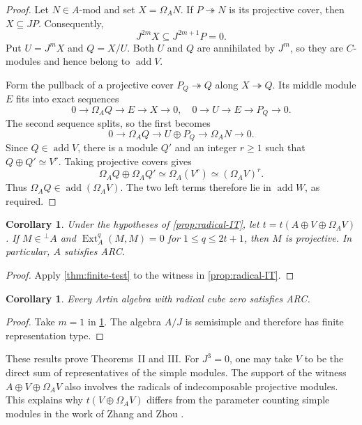 \documentclass[a4paper,reqno]{amsart}
\numberwithin{equation}{section}
\newtheorem{cor}[thm]{Corollary}
\theoremstyle{definition}
\DeclareMathOperator{\Ext}{Ext}
\DeclareMathOperator{\add}{add}
\newcommand{\modA}{A\text{-}\mathrm{mod}}
\newcommand{\perpA}{{}^{\perp}A}
\begin{document}
\begin{proof}
Let $N\in\modA$ and set $X=\Omega_A N$. If $P\twoheadrightarrow N$ is its projective cover, then $X\subseteq JP$. Consequently,
\[
J^{2m}X\subseteq J^{2m+1}P=0.
\]
Put $U=J^mX$ and $Q=X/U$. Both $U$ and $Q$ are annihilated by $J^m$, so they are $C$-modules and hence belong to $\add V$.

Form the pullback of a projective cover $P_Q\twoheadrightarrow Q$ along $X\twoheadrightarrow Q$. Its middle module $E$ fits into exact sequences
\[
0\longrightarrow\Omega_AQ\longrightarrow E\longrightarrow X\longrightarrow0,
\quad
0\longrightarrow U\longrightarrow E\longrightarrow P_Q\longrightarrow0.
\]
The second sequence splits, so the first becomes
\[
0\longrightarrow\Omega_AQ\longrightarrow U\oplus P_Q
\longrightarrow\Omega_A N\longrightarrow0.
\]
Since $Q\in\add V$, there is a module $Q'$ and an integer $r\geq1$ such that $Q\oplus Q'\simeq V^r$. Taking projective covers gives
\[
\Omega_AQ\oplus\Omega_AQ'\simeq\Omega_A(V^r)\simeq(\Omega_AV)^r.
\]
Thus $\Omega_AQ\in\add(\Omega_AV)$. The two left terms therefore lie in $\add W$, as required.
\end{proof}

\begin{cor}\label{cor:radical}
Under the hypotheses of \cref{prop:radical-IT}, let $t=t(A\oplus V\oplus\Omega_AV)$. If $M\in\perpA$ and $\Ext_A^q(M,M)=0$ for $1\leq q\leq2t+1$, then $M$ is projective. In particular, $A$ satisfies ARC.
\end{cor}

\begin{proof}
Apply \cref{thm:finite-test} to the witness in \cref{prop:radical-IT}.
\end{proof}

\begin{cor}\label{cor:cube-zero}
Every Artin algebra with radical cube zero satisfies ARC.
\end{cor}

\begin{proof}
Take $m=1$ in \cref{cor:radical}. The algebra $A/J$ is semisimple and therefore has finite representation type.
\end{proof}

These results prove Theorems~II and III. For $J^3=0$, one may take $V$ to be the direct sum of representatives of the simple modules. The support of the witness $A\oplus V\oplus\Omega_AV$ also involves the radicals of indecomposable projective modules. This explains why $t(V\oplus\Omega_AV)$ differs from the parameter counting simple modules in the work of Zhang and Zhou \cite{ZZ2026}.
\end{document}
